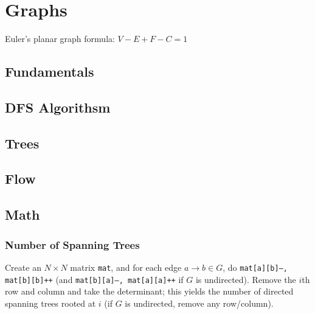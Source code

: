 \chapter{Graphs}
Euler's planar graph formula: $V - E + F - C = 1$

\section{Fundamentals}

\section {DFS Algorithsm}
    
\section{Trees}
    
\section{Flow}

\section{Math}
	\subsection{Number of Spanning Trees}
		Create an $N\times N$ matrix \texttt{mat}, and for each edge $a \rightarrow b \in G$, do
		\texttt{mat[a][b]--, mat[b][b]++} (and \texttt{mat[b][a]--, mat[a][a]++} if $G$ is undirected).
		Remove the $i$th row and column and take the determinant; this yields the number of directed spanning trees rooted at $i$
		(if $G$ is undirected, remove any row/column).


